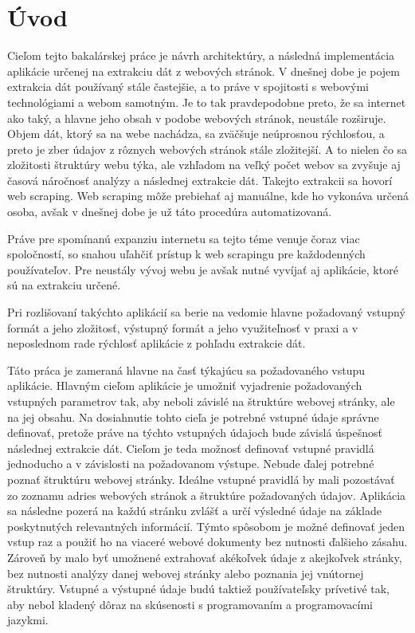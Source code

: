 \chapter{Úvod}

Cieľom tejto bakalárskej práce je návrh architektúry, a následná implementácia aplikácie určenej na extrakciu dát z webových stránok. V dnešnej dobe je pojem extrakcia dát používaný stále častejšie, a to práve v spojitosti s webovými technológiami a webom samotným. Je to tak pravdepodobne preto, že sa internet ako taký, a hlavne jeho obsah v podobe webových stránok, neustále rozširuje. Objem dát, ktorý sa na webe nachádza, sa zväčšuje neúprosnou rýchlosťou, a preto je zber údajov z rôznych webových stránok stále zložitejší. A to nielen čo sa zložitosti štruktúry webu týka, ale vzhľadom na veľký počet webov sa zvyšuje aj časová náročnosť analýzy a následnej extrakcie dát. Takejto extrakcii sa hovorí web scraping. Web scraping môže prebiehať aj manuálne, kde ho vykonáva určená osoba, avšak v dnešnej dobe je už táto procedúra automatizovaná.

Práve pre spomínanú expanziu internetu sa tejto téme venuje čoraz viac spoločností, so snahou uľahčiť prístup k web scrapingu pre každodenných používateľov. Pre neustály vývoj webu je avšak nutné vyvíjať aj aplikácie, ktoré sú na extrakciu určené. 

Pri rozlišovaní takýchto aplikácií sa berie na vedomie hlavne požadovaný vstupný formát a jeho zložitosť, výstupný formát a jeho využiteľnosť v praxi a v neposlednom rade rýchlosť aplikácie z pohľadu extrakcie dát. 

Táto práca je zameraná hlavne na časť týkajúcu sa požadovaného vstupu aplikácie. Hlavným cieľom aplikácie je umožniť vyjadrenie požadovaných vstupných parametrov tak, aby neboli závislé na štruktúre webovej stránky, ale na jej obsahu. Na dosiahnutie tohto cieľa je potrebné vstupné údaje správne definovať, pretože práve na týchto vstupných údajoch bude závislá úspešnosť následnej extrakcie dát. Cieľom je teda možnosť definovať vstupné pravidlá jednoducho a v závislosti na požadovanom výstupe. Nebude ďalej potrebné poznať štruktúru webovej stránky. Ideálne vstupné pravidlá by mali pozostávať zo zoznamu adries webových stránok a štruktúre požadovaných údajov. Aplikácia sa následne pozerá na každú stránku zvlášť a určí výsledné údaje na základe poskytnutých relevantných informácií. Týmto spôsobom je možné definovať jeden vstup raz a použiť ho na viaceré webové dokumenty bez nutnosti ďalšieho zásahu. Zároveň by malo byť umožnené extrahovať akékoľvek údaje z akejkoľvek stránky, bez nutnosti analýzy danej webovej stránky alebo poznania jej vnútornej štruktúry. Vstupné a výstupné údaje budú taktiež používateľsky prívetivé tak, aby nebol kladený dôraz na skúsenosti s programovaním a programovacími jazykmi.

